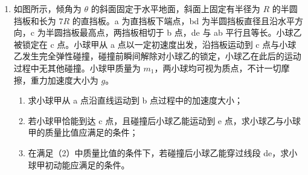 \documentclass[\gkver]{gaokaozhenti}
\begin{document}
\begin{enumerate}
{（3）设金属杆保持速度大小 $v$ 做匀速直线运动的最大路程为 $x$，此时刚好将要脱离导轨，此时绳子拉力为 $T$，与水平方向的夹角为 $\theta$，对金属杆根据受力平衡可知 $F_{\text{安}} = T\cos\theta$，$mg = T\sin\theta$

根据位置关系有 $\tan\theta = \frac{h}{s - x}$

同时有 $F_{\text{安}} = BIl$，$I = \frac{Blv}{2r(x + s)}$

联立解得 $x = \sqrt{s^{2} - \frac{B^{2}l^{2}hv}{2mgr}}$
}

\item
如图所示，倾角为 $\theta$ 的斜面固定于水平地面，斜面上固定有半径为 $R$ 的半圆挡板和长为 $7R$ 的直挡板。a 为直挡板下端点，bd 为半圆挡板直径且沿水平方向，c 为半圆挡板最高点，两挡板相切于 b 点，de 与 ab 平行且等长。小球乙被锁定在 c 点。小球甲从 a 点以一定初速度出发，沿挡板运动到 c 点与小球乙发生完全弹性碰撞，碰撞前瞬间解除对小球乙的锁定，小球乙在此后的运动过程中无其他碰撞。小球甲质量为 $m_{1}$，两小球均可视为质点，不计一切摩擦，重力加速度大小为 $g$。
\begin{enumerate}
	\item
	求小球甲从 a 点沿直线运动到 b 点过程中的加速度大小；
	\item
	若小球甲恰能到达 c 点，且碰撞后小球乙能运动到 e 点，求小球乙与小球甲的质量比值应满足的条件；
	\item
	在满足（2）中质量比值的条件下，若碰撞后小球乙能穿过线段 de，求小球甲初动能应满足的条件。
\end{enumerate}


\end{enumerate}
\end{document}
